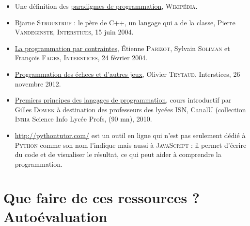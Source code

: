 \begin{gofurther}
\begin{itemize}\jazzitem
\item Une définition des \href{https://fr.wikipedia.org/wiki/Paradigme_(programmation)}{paradigmes de programmation}, \textsc{Wikipédia}.
\item \href{https://interstices.info/bjarne-stroustrup-le-pere-de-c-un-langage-qui-a-de-la-classe/}{Bjarne \textsc{Stroustrup} : le père de C++, un langage qui a de la classe}, Pierre \textsc{Vandeginste}, \textsc{Interstices}, 15 juin 2004.
\item \href{https://interstices.info/la-programmation-par-contraintes/}{La programmation par contraintes}, Étienne \textsc{Parizot}, Sylvain \textsc{Soliman} et François \textsc{Fages}, \textsc{Interstices}, 24 février 2004.
\item \href{https://interstices.info/programmation-des-echecs-et-dautres-jeux/}{Programmation des échecs et d’autres jeux}, Olivier \textsc{Teytaud}, Interstices, 26 novembre 2012.
\end{itemize}

\vspace{2pt}
\begin{itemize}\jazzitem
\item \href{https://www.canal-u.tv/video/inria/premiers_principes_des_langages_de_programmation.6473}{Premiers principes des langages de programmation}, cours introductif par Gilles \textsc{Dowek} à destination des professeurs des lycées ISN, CanalU (collection \textsc{Inria} Science Info Lycée Profs, (90 mn), 2010.
\end{itemize}

\vspace{2pt}
\begin{itemize}\jazzitem
\item \url{http://pythontutor.com/} est un outil en ligne qui n'est pas seulement dédié à \textsc{Python} comme son nom l'indique mais aussi à \textsc{JavaScript} : il permet d'écrire du code et de visualiser le résultat, ce qui peut aider à comprendre la programmation.
\end{itemize}

\end{gofurther}



\section[Que faire de ces ressources ? Quiz]{Que faire de ces ressources ? Autoévaluation}
\label{sec:VI.5}


